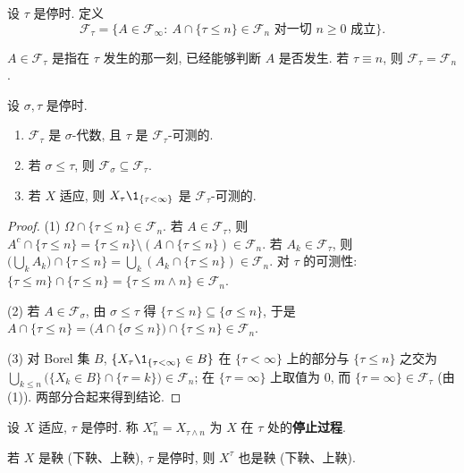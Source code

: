 \begin{definition}[停时前的信息]\label{def:F-tau}
设 $\tau$ 是停时. 定义
\[
\mathcal{F}_\tau=\big\{A\in\mathcal{F}_\infty:\ A\cap\{\tau\le n\}\in\mathcal{F}_n\text{ 对一切 }n\ge0\text{ 成立}\big\}.
\]
\end{definition}

$A\in\mathcal{F}_\tau$ 是指在 $\tau$ 发生的那一刻, 已经能够判断 $A$ 是否发生. 若 $\tau\equiv n$, 则 $\mathcal{F}_\tau=\mathcal{F}_n$.

\begin{proposition}\label{prop:F-tau}
设 $\sigma,\tau$ 是停时.
\begin{enumerate}
\item $\mathcal{F}_\tau$ 是 $\sigma$-代数, 且 $\tau$ 是 $\mathcal{F}_\tau$-可测的.
\item 若 $\sigma\le\tau$, 则 $\mathcal{F}_\sigma\subseteq\mathcal{F}_\tau$.
\item 若 $X$ 适应, 则 $X_\tau\1_{\{\tau<\infty\}}$ 是 $\mathcal{F}_\tau$-可测的.
\end{enumerate}
\end{proposition}

\begin{proof}
(1) $\Omega\cap\{\tau\le n\}\in\mathcal{F}_n$. 若 $A\in\mathcal{F}_\tau$, 则 $A^c\cap\{\tau\le n\}=\{\tau\le n\}\setminus(A\cap\{\tau\le n\})\in\mathcal{F}_n$. 若 $A_k\in\mathcal{F}_\tau$, 则 $\big(\bigcup_kA_k\big)\cap\{\tau\le n\}=\bigcup_k(A_k\cap\{\tau\le n\})\in\mathcal{F}_n$. 对 $\tau$ 的可测性: $\{\tau\le m\}\cap\{\tau\le n\}=\{\tau\le m\wedge n\}\in\mathcal{F}_n$.

(2) 若 $A\in\mathcal{F}_\sigma$, 由 $\sigma\le\tau$ 得 $\{\tau\le n\}\subseteq\{\sigma\le n\}$, 于是 $A\cap\{\tau\le n\}=\big(A\cap\{\sigma\le n\}\big)\cap\{\tau\le n\}\in\mathcal{F}_n$.

(3) 对 Borel 集 $B$, $\{X_\tau\1_{\{\tau<\infty\}}\in B\}$ 在 $\{\tau<\infty\}$ 上的部分与 $\{\tau\le n\}$ 之交为 $\bigcup_{k\le n}\big(\{X_k\in B\}\cap\{\tau=k\}\big)\in\mathcal{F}_n$; 在 $\{\tau=\infty\}$ 上取值为 $0$, 而 $\{\tau=\infty\}\in\mathcal{F}_\tau$ (由 (1)). 两部分合起来得到结论.
\end{proof}

\begin{definition}[停止过程]\label{def:stopped-process}
设 $X$ 适应, $\tau$ 是停时. 称 $X^\tau_n=X_{\tau\wedge n}$ 为 $X$ 在 $\tau$ 处的\textbf{停止过程}.
\end{definition}

\begin{theorem}[停止过程仍是鞅]\label{thm:stopped-martingale}
若 $X$ 是鞅 (下鞅、上鞅), $\tau$ 是停时, 则 $X^\tau$ 也是鞅 (下鞅、上鞅).
\end{theorem}

